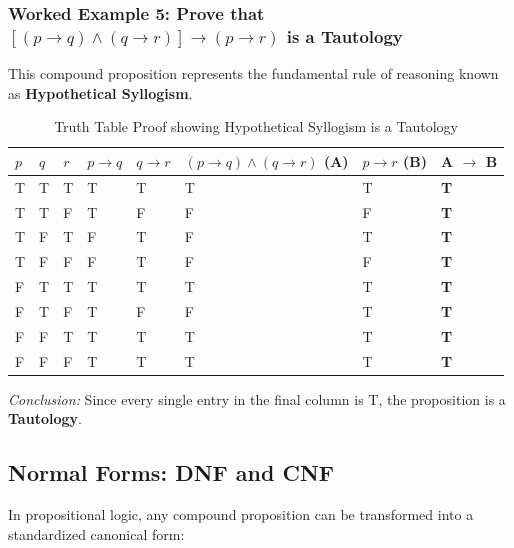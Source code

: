\documentclass[11pt,a4paper]{article}
\begin{document}
\subsubsection*{Worked Example 5: Prove that $[(p \rightarrow q) \land (q \rightarrow r)] \rightarrow (p \rightarrow r)$ is a Tautology}

This compound proposition represents the fundamental rule of reasoning known as \textbf{Hypothetical Syllogism}.

\begin{table}[htbp]
\centering
\small
\begin{tabularx}{\textwidth}{|*{8}{>{\centering\arraybackslash}X|}}
\hline
\rowcolor{primaryblue} \color{white}$p$ & \color{white}$q$ & \color{white}$r$ & \color{white}$p \rightarrow q$ & \color{white}$q \rightarrow r$ & \color{white}$(p \rightarrow q) \land (q \rightarrow r)$ (A) & \color{white}$p \rightarrow r$ (B) & \color{white}\textbf{A $\rightarrow$ B} \\ \hline
T & T & T & T & T & T & T & \textbf{T} \\ \hline
T & T & F & T & F & F & F & \textbf{T} \\ \hline
T & F & T & F & T & F & T & \textbf{T} \\ \hline
T & F & F & F & T & F & F & \textbf{T} \\ \hline
F & T & T & T & T & T & T & \textbf{T} \\ \hline
F & T & F & T & F & F & T & \textbf{T} \\ \hline
F & F & T & T & T & T & T & \textbf{T} \\ \hline
F & F & F & T & T & T & T & \textbf{T} \\ \hline
\end{tabularx}
\caption{Truth Table Proof showing Hypothetical Syllogism is a Tautology}
\end{table}

\noindent \textit{Conclusion:} Since every single entry in the final column is $\text{T}$, the proposition is a \textbf{Tautology}.

\subsection{Normal Forms: DNF and CNF}

In propositional logic, any compound proposition can be transformed into a standardized canonical form:
\end{document}
